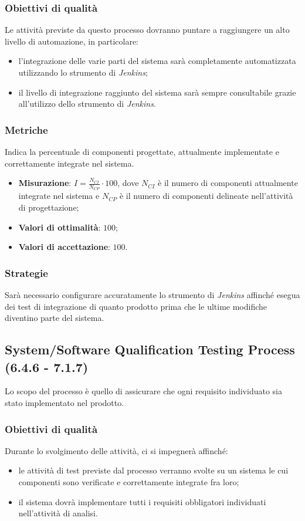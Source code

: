 \subsubsection{Obiettivi di qualità}
Le attività previste da questo processo dovranno puntare a raggiungere un alto livello di automazione, in particolare:
\begin{itemize}
\item l'integrazione delle varie parti del sistema sarà completamente automatizzata utilizzando lo strumento di  \textit{Jenkins};
\item il livello di integrazione raggiunto del sistema sarà sempre consultabile grazie all'utilizzo dello strumento di  \textit{Jenkins}.
\end{itemize}
\subsubsection{Metriche}
\label{compInt}
Indica la percentuale di componenti progettate, attualmente implementate e correttamente integrate nel sistema.
\begin{itemize}
\item \textbf{Misurazione}: $I=\frac{N_{CI}}{N_{CP}} \cdot 100$, dove $N_{CI}$ è il numero di componenti attualmente integrate nel sistema e $N_{CP}$ è il numero di componenti delineate nell'attività di progettazione;
\item \textbf{Valori di ottimalità}: $100$;
\item \textbf{Valori di accettazione}: $100$.
\end{itemize}
\subsubsection{Strategie}
Sarà necessario configurare accuratamente lo strumento di  \textit{Jenkins} affinché esegua dei test di integrazione di quanto prodotto prima che le ultime modifiche diventino parte del sistema.
\subsection{System/Software Qualification Testing Process (6.4.6 - 7.1.7)}
\label{sySoQualTest}
Lo scopo del processo è quello di assicurare che ogni requisito individuato sia stato implementato nel prodotto.
\subsubsection{Obiettivi di qualità}
Durante lo svolgimento delle attività, ci si impegnerà affinché:
\begin{itemize}
\item le attività di test previste dal processo verranno svolte su un sistema le cui componenti sono verificate e correttamente integrate fra loro;
\item il sistema dovrà implementare tutti i requisiti obbligatori individuati nell'attività di analisi.
\end{itemize}
